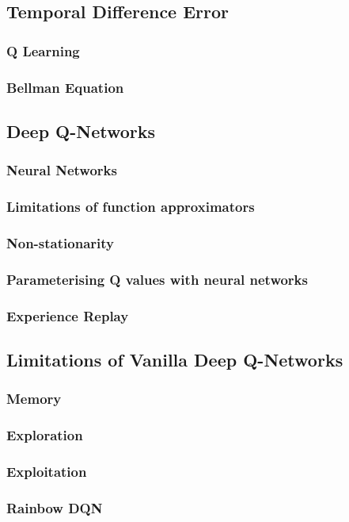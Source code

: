 \subsection{Temporal Difference Error}
\subsubsection{Q Learning}
\subsubsection{Bellman Equation}
\subsection{Deep Q-Networks}
\subsubsection{Neural Networks}
\subsubsection{Limitations of function approximators}
\subsubsection{Non-stationarity}
\subsubsection{Parameterising Q values with neural networks}
\subsubsection{Experience Replay}
\subsection{Limitations of Vanilla Deep Q-Networks}
\subsubsection{Memory}
\subsubsection{Exploration}
\subsubsection{Exploitation}
\subsubsection{Rainbow DQN}